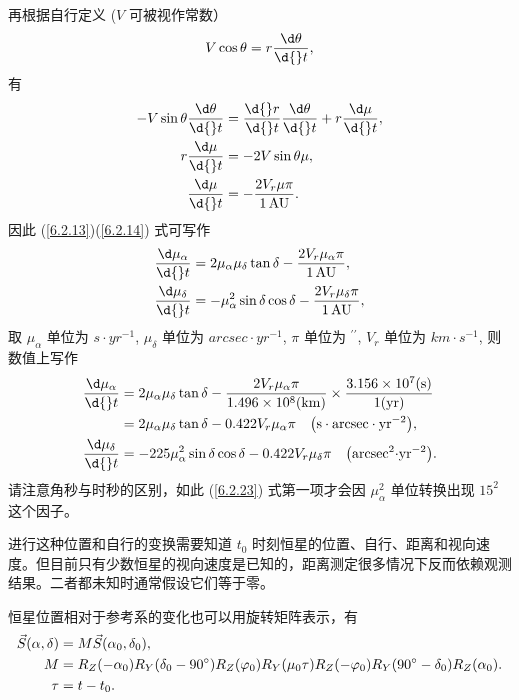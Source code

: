 \documentclass[UTF8, 12pt, a4paper, oneside, onecolumn, fontset=none]{ctexart}
\begin{document}
再根据自行定义 ($V$ 可被视作常数）
\begin{equation}
V\cos{\theta}=r\frac{\d\theta}{\d{}t},
\end{equation}
有
\begin{align}
-V\sin{\theta}\frac{\d\theta}{\d{}t}&=\frac{\d{}r}{\d{}t}\frac{\d\theta}{\d{}t}+r\frac{\d\mu}{\d{}t},\notag\\
r\frac{\d\mu}{\d{}t}&=-2V\sin{\theta}\mu,\notag\\
\frac{\d\mu}{\d{}t}&=-\frac{2V_{r}\mu\pi}{\qty{1}{AU}}.
\end{align}
因此 (\ref{6.2.13})(\ref{6.2.14}) 式可写作
\begin{align}
\frac{\d\mu_{\alpha}}{\d{}t}&=2\mu_{\alpha}\mu_{\delta}\tan{\delta}-\frac{2V_{r}\mu_{\alpha}\pi}{\qty{1}{AU}},\\
\frac{\d\mu_{\delta}}{\d{}t}&=-\mu_{\alpha}^{2}\sin{\delta}\cos{\delta}-\frac{2V_{r}\mu_{\delta}\pi}{\qty{1}{AU}},
\end{align}
取 $\mu_{\alpha}$ 单位为 $\unit{s\cdot yr^{-1}}$, $\mu_{\delta}$ 单位为 $\unit{arcsec\cdot yr^{-1}}$, $\pi$ 单位为 $^{\prime\prime}$, $V_{r}$ 单位为 $\unit{km\cdot{}s^{-1}}$, 则数值上写作
\begin{align}
\frac{\d\mu_{\alpha}}{\d{}t}&=2\mu_{\alpha}\mu_{\delta}\tan{\delta}-\frac{2V_{r}\mu_{\alpha}\pi}{1.496\times10^{8}\mleft(\unit{km}\mright)}\times\frac{3.156\times10^{7}\mleft(\unit{s}\mright)}{1\mleft(\unit{yr}\mright)}\\
&=2\mu_{\alpha}\mu_{\delta}\tan{\delta}-0.422V_{r}\mu_{\alpha}\pi\quad\mleft(\unit{s\cdot arcsec\cdot yr^{-2}}\mright),\\
\frac{\d\mu_{\delta}}{\d{}t}&=-225\mu_{\alpha}^{2}\sin{\delta}\cos{\delta}-0.422V_{r}\mu_{\delta}\pi\quad\mleft(\unit{arcsec^{2}\cdot yr^{-2}}\mright).\label{6.2.23}
\end{align}
请注意角秒与时秒的区别，如此 (\ref{6.2.23}) 式第一项才会因 $\mu_{\alpha}^{2}$ 单位转换出现 $15^{2}$ 这个因子。

进行这种位置和自行的变换需要知道 $t_{0}$ 时刻恒星的位置、自行、距离和视向速度。但目前只有少数恒星的视向速度是已知的，距离测定很多情况下反而依赖观测结果。二者都未知时通常假设它们等于零。

恒星位置相对于参考系的变化也可以用旋转矩阵表示，有
\begin{align}
\vec{S}\mleft(\alpha,\delta\mright)&=M\vec{S}\mleft(\alpha_{0},\delta_{0}\mright),\\
M&=R_{Z}\mleft(-\alpha_{0}\mright) R_{Y}\mleft(\delta_{0}-\ang{90;;}\mright) R_{Z}\mleft(\varphi_{0}\mright) R_{Y}\mleft(\mu_{0}\tau\mright) R_{Z}\mleft(-\varphi_{0}\mright) R_{Y}\mleft(\ang{90;;}-\delta_{0}\mright) R_{Z}\mleft(\alpha_{0}\mright).\\
\tau&=t-t_{0}.
\end{align}
\end{document}
